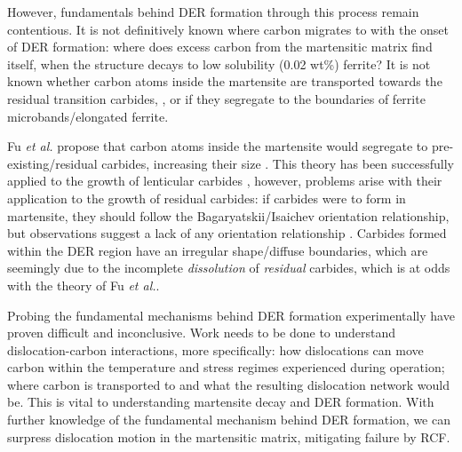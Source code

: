 \documentclass[a4paper,11pt]{article}
\begin{document}
However, fundamentals behind DER formation through this process remain contentious. It is not
definitively known where carbon migrates to with the onset of DER formation: where does excess
carbon from the martensitic matrix find itself, when the structure decays to low solubility
(0.02 wt\%) ferrite? It is not known whether carbon atoms inside the martensite are transported
towards the residual transition carbides, \cite{fu17_strain_induc_marten_decay_bearin}, or if they
segregate to the boundaries of ferrite microbands/elongated ferrite.


Fu \emph{et al.} propose that carbon atoms inside the martensite would segregate to
pre-existing/residual carbides, increasing their size
\cite{fu17_strain_induc_marten_decay_bearin}. This theory has been successfully applied to the
growth of lenticular carbides \cite{Fu2017}, however, problems arise with their application to the
growth of residual carbides: if carbides were to form in martensite, they should follow the
Bagaryatskii/Isaichev orientation relationship, but observations suggest a lack of any orientation
relationship \cite{Bhadeshia2018}. Carbides formed within the DER region have an irregular
shape/diffuse boundaries, which are seemingly due to the incomplete \emph{dissolution} of \emph{residual}
carbides, which is at odds with the theory of Fu \emph{et al.}.



Probing the fundamental mechanisms behind DER formation experimentally have proven difficult and
inconclusive. Work needs to be done to understand dislocation-carbon interactions, more specifically: how
dislocations can move carbon within the temperature and stress regimes experienced during
operation; where carbon is transported to and what the resulting dislocation network would be. This is vital to
understanding martensite decay and DER formation. With further knowledge of the fundamental
mechanism behind DER formation, we can surpress dislocation motion in the martensitic
matrix, mitigating failure by RCF.
\end{document}
